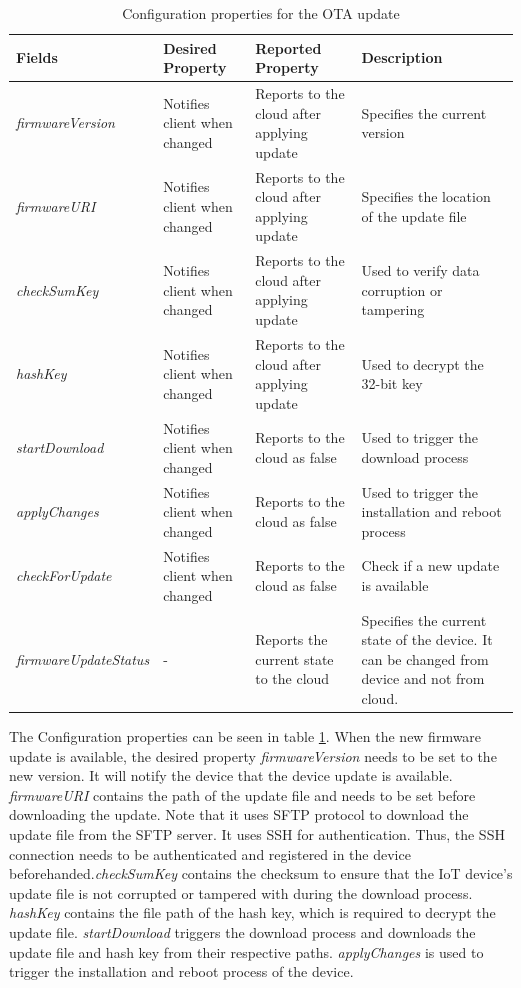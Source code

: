 \documentclass[12pt,a4paper]{article}
\begin{document}
{\begin{table}
\footnotesize
\centering
\begin{tabular}{ |p{3.5cm}||p{3cm}|p{2.5cm}|p{4cm}|}
 \hline
 Fields & Desired Property  & Reported Property & Description \\
 \hline
 \textit{firmwareVersion} & Notifies client when changed & Reports to the cloud after applying update & Specifies the current version\\
 \hline
 \textit{firmwareURI} & Notifies client when changed & Reports to the cloud after applying update & Specifies the location of the update file\\
 \hline
 \textit{checkSumKey} & Notifies client when changed & Reports to the cloud after applying update & Used to verify data corruption or tampering\\
 \hline
 \textit{hashKey} & Notifies client when changed & Reports to the cloud after applying update & Used to decrypt the 32-bit key\\
 \hline
 \textit{startDownload} & Notifies client when changed & Reports to the cloud as false & Used to trigger the download process\\
 \hline
 \textit{applyChanges} & Notifies client when changed & Reports to the cloud as false & Used to trigger the installation and reboot process\\
 \hline
 \textit{checkForUpdate} & Notifies client when changed & Reports to the cloud as false & Check if a new update is available\\
 \hline
 \textit{firmwareUpdateStatus} & - & Reports the current state to the cloud & Specifies the current state of the device. It can be changed from device and not from cloud. \\
 \hline
\end{tabular}
\caption{Configuration properties for the OTA update}
\label{property_prototype}
\end{table}

\newpage
The Configuration properties can be seen in table \ref{property_prototype}. When the new firmware update is available, the desired property \textit{firmwareVersion} needs to be set to the new version. It will notify the device that the device update is available. \textit{firmwareURI} contains the path of the update file and needs to be set before downloading the update. Note that it uses SFTP protocol to download the update file from the SFTP server. It uses SSH for authentication. Thus, the SSH connection needs to be authenticated and registered in the device beforehanded.\textit{checkSumKey} contains the checksum to ensure that the IoT device's update file is not corrupted or tampered with during the download process. \textit{hashKey} contains the file path of the hash key, which is required to decrypt the update file. \textit{startDownload} triggers the download process and downloads the update file and hash key from their respective paths. \textit{applyChanges} is used to trigger the installation and reboot process of the device. \\

}
\end{document}
